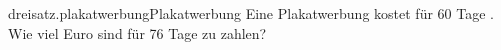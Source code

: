 \begin{exercise}{dreisatz.plakatwerbung}{Plakatwerbung}
  \ifproblem\problem
    Eine Plakatwerbung kostet für 60 Tage .
    Wie viel Euro sind für 76 Tage zu zahlen?
  \fi
\end{exercise}
